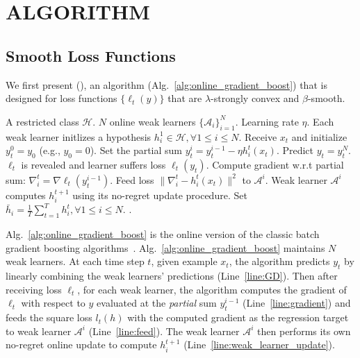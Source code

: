 \section{ALGORITHM}
\label{sec:sgb_algorithm}

\subsection{Smooth Loss Functions}
We first present \algname (\algshort), an algorithm (Alg.~\ref{alg:online_gradient_boost}) that is designed for loss functions $\{\ell_t(y)\}$ that are $\lambda$-strongly convex and $\beta$-smooth. 
\begin{algorithm}[tb]
\caption{\algname (\algshort)}
 \label{alg:online_gradient_boost}
\begin{algorithmic}[1]
   A restricted  class $\mathcal{H}$. $N$ online weak learners $\{\mathcal{A}_i\}_{i=1}^N$. Learning rate $\eta$.
  \STATE Each weak learner initlizes a hypothesis $h_i^1\in\mathcal{H},\forall 1\leq i\leq N$.
    \STATE Receive  $x_t$ and initialize $y_t^{0} = y_0$ (e.g., $y_0 = 0$). 
    \label{line:GD}
        \STATE Set the partial sum $y_t^{i} = y_t^{i-1} - \eta h_i^{t}(x_t)$.
    \ENDFOR
    \STATE Predict $y_t = y_t^N$.
    \STATE $\ell_t$ is revealed and learner suffers loss $\ell_t(y_t)$.
        \STATE Compute gradient w.r.t partial sum: $\nabla_i^t = \nabla\ell_t(y_t^{i-1})$.
        \label{line:gradient}
        \STATE Feed loss $\|\nabla_i^t - h_i^t(x_t)\|^2$ to $\mathcal{A}^i$.
        \label{line:feed}
        \STATE Weak learner $\mathcal{A}^i$ computes $h_i^{t+1}$ using its no-regret update procedure.
        \label{line:weak_learner_update}
    \ENDFOR
 \ENDFOR
 \STATE Set $\bar{h}_i =\frac{1}{T} \sum_{t=1}^Th_{i}^t,\forall 1\leq i\leq N$. \label{line:average}
 . \label{line:stoch_return} 
\end{algorithmic}
\end{algorithm}
Alg.~\ref{alg:online_gradient_boost} is the online version of the classic batch gradient boosting algorithms~\citep{friedman2001greedy,grubb2011generalized}. Alg.~\ref{alg:online_gradient_boost} maintains $N$ weak learners. At each time step $t$, given example $x_t$, the algorithm predicts $y_t$ by linearly combining the weak learners' predictions (Line~\ref{line:GD}). Then after receiving loss $\ell_t$, for each weak learner, the algorithm computes the gradient of $\ell_t$ with respect to $y$ evaluated at the \emph{partial} sum $y_t^{i-1}$ (Line~\ref{line:gradient}) and feeds the square loss  $l_t(h)$ with the computed gradient as the regression target to weak learner $\mathcal{A}^i$ (Line~\ref{line:feed}). The weak learner $\mathcal{A}^i$ then performs its own no-regret online update to compute $h_{i}^{t+1}$ (Line~\ref{line:weak_learner_update}).

